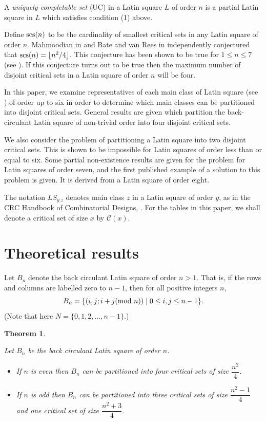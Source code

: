 \documentclass[11pt]{article}
\newtheorem{theorem}{Theorem}[section]
\begin{document}
A {\em uniquely completable set} (UC)
in a Latin square $L$ of order $n$ is a partial Latin square in
$L$ which satisfies condition (1) above.

Define ${\rm scs}(n)$ to be the cardinality of smallest critical sets
in any Latin square of order $n$. Mahmoodian in \cite {M} and 
Bate and van Rees in \cite {BR} independently 
conjectured that ${\rm scs}(n)=\lfloor n^2/4 \rfloor$. This conjecture 
has been shown to be true for $1\leq n \leq 7$ (see \cite{AK,BR,CR,DCNS,H}).
If this conjecture turns out to be true then the maximum number of
disjoint critical sets in a Latin square of order $n$ will be four.

In this paper, we examine representatives of each main class of Latin
square (see \cite{CD}) of order up to six in order to determine which
main
classes can be partitioned into disjoint critical sets.  General results
are given which partition the back-circulant Latin square of non-trivial
order into four disjoint critical sets.

We also consider the problem of partitioning a Latin square into two
disjoint critical sets.  This is shown to be impossible for Latin
squares of order less than or equal to six.  Some partial non-existence
results are given for the problem for Latin squares of order seven,
and the first published example of a solution to this problem is given.
It is derived from a Latin square of order eight.

The notation $LS_{y.z}$ denotes main class $z$ in a Latin square of
order $y$, as in the CRC Handbook of Combinatorial Designs, \cite{CD}.
For the tables in this paper, we shall denote a critical set of size $x$
by ${\mathcal C}(x)$.


\section{Theoretical results}

Let $B_n$ denote the back circulant Latin square of order $n>1$. That is, 
if the rows and columns are labelled zero to $n-1$, then for all 
positive integers $n$,
$$
B_n=\{(i,j;i+j({\rm mod\ } n))\mid 0\leq i,j\leq n-1\}. 
$$
(Note that here $N=\{0,1,2,\ldots,n-1\}$.)

\begin{theorem}\label{bkcircth}{\rm
Let $B_n$ be the back circulant Latin square of order $n$. 
\begin{itemize}
\item[(1)] If $n$ is even then $B_n$ can be partitioned into
four critical sets of size $\dfrac{n^2}{4}$.
\item[(2)] If $n$ is odd then $B_n$ can be partitioned into
three critical sets of size $\dfrac{n^2-1}{4}$ and one critical set of size
$\dfrac{n^2+3}{4}$.
\end{itemize}
}
\end{theorem}
\end{document}
